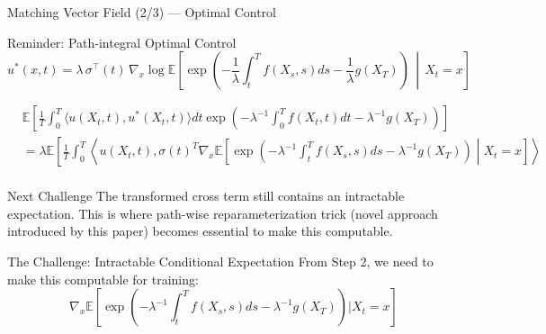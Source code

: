\documentclass[aspectratio=169,xcolor=dvipsnames]{beamer}
\begin{document}
\begin{frame}[allowframebreaks]{Matching Vector Field (2/3) — Optimal Control}
        \begin{block}{Reminder: Path-integral Optimal Control}
        $$u^*(x,t) = \lambda \, \sigma^\top(t) \, \nabla_x \log \mathbb{E}\left[\exp\left(-\frac{1}{\lambda}\int_t^T f(X_s,s) ds - \frac{1}{\lambda} g(X_T)\right) \,\middle|\, X_t = x\right]$$

    \end{block}

    \begin{equation}
    \begin{aligned}
    &\mathbb{E}\left[\frac{1}{T}\int_0^T \langle u(X_t,t), u^*(X_t,t)\rangle dt \exp\left(-\lambda^{-1}\int_0^T f(X_t,t) dt - \lambda^{-1}g(X_T)\right)\right] \\[8pt]
    &= \lambda \mathbb{E}\left[\frac{1}{T}\int_0^T \left\langle u(X_t,t), \sigma(t)^T \nabla_x \mathbb{E}\left[\exp\left(-\lambda^{-1}\int_t^T f(X_s,s) ds - \lambda^{-1}g(X_T)\right) \middle| X_t = x\right]\right\rangle \right. \\[4pt]
    \end{aligned}
    \end{equation}
    
    \vspace{0.5cm}
    
    \begin{alertblock}{Next Challenge}
        The transformed cross term still contains an intractable expectation. This is where path-wise reparameterization trick (novel approach introduced by this paper) becomes essential to make this computable.
    \end{alertblock}

    \begin{block}{The Challenge: Intractable Conditional Expectation}
        From Step 2, we need to make this computable for training:
        $$\nabla_x \mathbb{E}\left[\exp\left(-\lambda^{-1}\int_t^T f(X_s,s)ds - \lambda^{-1}g(X_T)\right) \bigg| X_t = x\right]$$
    \end{block}
    
    \vspace{0.5cm}

\end{frame}
\end{document}
